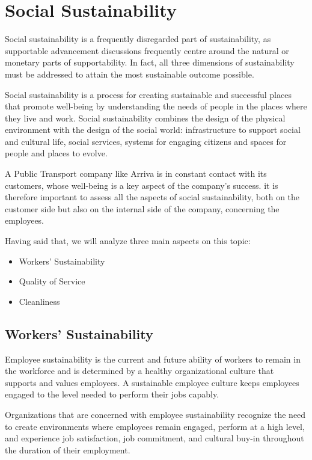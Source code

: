 \newpage
\section{Social Sustainability}
Social sustainability is a frequently disregarded part of sustainability, as supportable advancement discussions frequently centre around the natural or monetary parts of supportability. In fact, all three dimensions of sustainability must be addressed to attain the most sustainable outcome possible.

Social sustainability is a process for creating sustainable and successful places that promote well-being by understanding the needs of people in the places where they live and work. Social sustainability combines the design of the physical environment with the design of the social world: infrastructure to support social and cultural life, social services, systems for engaging citizens and spaces for people and places to evolve. 

A Public Transport company like Arriva is in constant contact with its customers, whose well-being is a key aspect of the company's success. it is therefore important to assess all the aspects of social sustainability, both on the customer side but also on the internal side of the company, concerning the employees.

Having said that, we will analyze three main aspects on this topic:

\begin{itemize}
    \item Workers’ Sustainability
    \item Quality of Service
    \item Cleanliness
\end{itemize}

\subsection{Workers’ Sustainability}
Employee sustainability is the current and future ability of workers to remain in the workforce and is determined by a healthy organizational culture that supports and values employees. A sustainable employee culture keeps employees engaged to the level needed to perform their jobs capably.

Organizations that are concerned with employee sustainability recognize the need to create environments where employees remain engaged, perform at a high level, and experience job satisfaction, job commitment, and cultural buy-in throughout the duration of their employment. 

